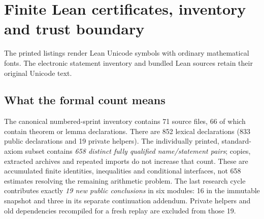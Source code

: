 \documentclass[11pt,a4paper]{article}
\theoremstyle{definition}
\theoremstyle{remark}
\begin{document}
\appendix


\section{Finite Lean certificates, inventory and trust boundary}
\label{app:lean-certificates}
\begingroup
{}
\lstset{style=GoldbachLeanAppendix}
The printed listings render Lean Unicode symbols with ordinary mathematical
fonts. The electronic statement inventory and bundled Lean sources retain
their original Unicode text.

\subsection{What the formal count means}

The canonical numbered-sprint inventory contains 71 source files,
66 of which contain theorem or lemma declarations. There are 852
lexical declarations (833 public declarations and 19 private helpers).
The individually printed, standard-axiom subset contains
\emph{658 distinct fully qualified name/statement pairs}; copies,
extracted archives and repeated imports do not increase that count.
These are accumulated finite identities, inequalities and conditional
interfaces, not 658 estimates resolving the remaining arithmetic problem.
The last research cycle contributes exactly \emph{19 new public conclusions}
in six modules: 16 in the immutable snapshot and three in its separate
continuation addendum. Private helpers and old dependencies recompiled
for a fresh replay are excluded from those 19.
\end{document}
